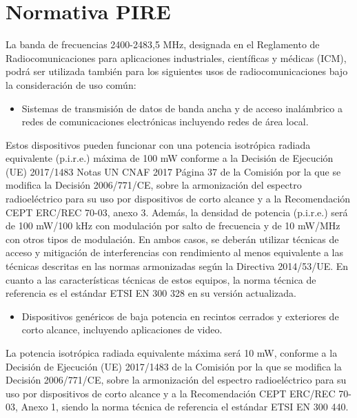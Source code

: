 \documentclass{article}
\begin{document}
\section{Normativa PIRE}

La banda de frecuencias 2400-2483,5 MHz, designada en el Reglamento de
Radiocomunicaciones para aplicaciones industriales, científicas y médicas (ICM),
podrá ser utilizada también para los siguientes usos de radiocomunicaciones bajo la
consideración de uso común:

\begin{itemize}

    \item Sistemas de transmisión de datos de banda ancha y de acceso inalámbrico
    a redes de comunicaciones electrónicas incluyendo redes de área local.

\end{itemize}

    Estos dispositivos pueden funcionar con una potencia isotrópica radiada equivalente
    (p.i.r.e.) máxima de 100 mW conforme a la Decisión de Ejecución (UE) 2017/1483
    Notas UN CNAF 2017 Página 37
    de la Comisión por la que se modifica la Decisión 2006/771/CE, sobre la
    armonización del espectro radioeléctrico para su uso por dispositivos de corto
    alcance y a la Recomendación CEPT ERC/REC 70-03, anexo 3.
    Además, la densidad de potencia (p.i.r.e.) será de 100 mW/100 kHz con modulación
    por salto de frecuencia y de 10 mW/MHz con otros tipos de modulación. En ambos
    casos, se deberán utilizar técnicas de acceso y mitigación de interferencias con
    rendimiento al menos equivalente a las técnicas descritas en las normas
    armonizadas según la Directiva 2014/53/UE.
    En cuanto a las características técnicas de estos equipos, la norma técnica de
    referencia es el estándar ETSI EN 300 328 en su versión actualizada.

\begin{itemize}
    \item Dispositivos genéricos de baja potencia en recintos cerrados y exteriores
    de corto alcance, incluyendo aplicaciones de video.
\end{itemize}
    La potencia isotrópica radiada equivalente máxima será 10 mW, conforme a la
    Decisión de Ejecución (UE) 2017/1483 de la Comisión por la que se modifica la
    Decisión 2006/771/CE, sobre la armonización del espectro radioeléctrico para su uso
    por dispositivos de corto alcance y a la Recomendación CEPT ERC/REC 70-03,
    Anexo 1, siendo la norma técnica de referencia el estándar ETSI EN 300 440. 
\end{document}
